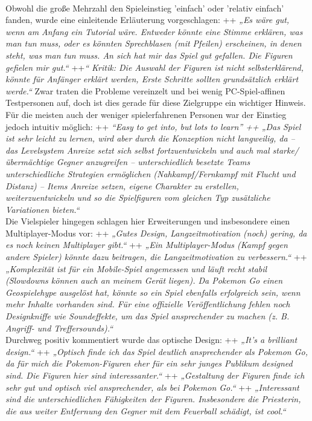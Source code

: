 \documentclass[extern,palatino]{cgBA}
\begin{document}
\\Obwohl die große Mehrzahl den Spieleinstieg 'einfach' oder 'relativ einfach' fanden, wurde eine einleitende Erläuterung vorgeschlagen: ++ \textit{„Es wäre gut, wenn am Anfang ein Tutorial wäre. Entweder könnte eine Stimme erklären, was man tun muss, oder es könnten Sprechblasen (mit Pfeilen) erscheinen, in denen steht, was man tun muss. An sich hat mir das Spiel gut gefallen. Die Figuren gefielen mir gut.“} ++\textit{“ Kritik: Die Auswahl der Figuren ist nicht selbsterklärend, könnte für Anfänger erklärt werden, Erste Schritte sollten grundsätzlich erklärt werde.“} Zwar traten die Probleme vereinzelt und bei wenig PC-Spiel-affinen Testpersonen auf, doch ist dies gerade für diese Zielgruppe ein wichtiger Hinweis. Für die meisten auch der weniger spielerfahrenen Personen war der Einstieg jedoch intuitiv möglich: ++ \textit{“Easy to get into, but lots to learn” ++ „Das Spiel ist sehr leicht zu lernen, wird aber durch die Konzeption nicht langweilig, da – das Levelsystem Anreize setzt sich selbst fortzuentwickeln und auch mal starke/übermächtige Gegner anzugreifen – unterschiedlich besetzte Teams unterschiedliche Strategien ermöglichen (Nahkampf/Fernkampf  mit Flucht und Distanz) – Items Anreize setzen, eigene Charakter zu erstellen, weiterzuentwickeln und so die Spielfiguren vom gleichen Typ zusätzliche Variationen bieten.“}\\
Die Vielspieler hingegen schlagen hier Erweiterungen und insbesondere einen Multiplayer-Modus vor: ++ \textit{„Gutes Design, Langzeitmotivation (noch) gering, da es noch keinen Multiplayer gibt.“} ++ \textit{„Ein Multiplayer-Modus (Kampf gegen andere Spieler) könnte dazu beitragen, die Langzeitmotivation zu verbessern.“} ++ \textit{„Komplexität ist für ein Mobile-Spiel angemessen und läuft recht stabil (Slowdowns können auch an meinem Gerät liegen). Da Pokemon Go einen Geospielehype ausgelöst hat, könnte so ein Spiel ebenfalls erfolgreich sein, wenn mehr Inhalte vorhanden sind. Für eine offizielle Veröffentlichung fehlen noch Designkniffe wie Soundeffekte, um das Spiel ansprechender zu machen (z. B. Angriff- und Treffersounds).“}
\\Durchweg positiv kommentiert wurde das optische Design: ++ \textit{„It's a brilliant design.“} ++ \textit{„Optisch finde ich das Spiel deutlich ansprechender als Pokemon Go, da für mich die Pokemon-Figuren eher für ein sehr junges Publikum designed sind. Die Figuren hier sind interessanter.“} ++ \textit{„Gestaltung der Figuren finde ich sehr gut und optisch viel ansprechender, als bei Pokemon Go.“} ++ \textit{„Interessant sind die unterschiedlichen Fähigkeiten der Figuren. Insbesondere die Priesterin, die aus weiter Entfernung den Gegner mit dem Feuerball schädigt, ist cool.“} 
\end{document}
